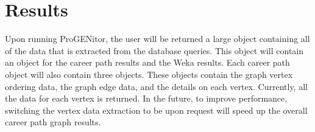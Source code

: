 \chapter{Results}
\label{chap:results}
Upon running ProGENitor, the user will be returned a large object
containing all of the data that is extracted from the database queries.  This
object will contain an object for the career path results and the Weka
results.  Each career path object will also contain three objects.  These
objects contain the graph vertex ordering data, the graph edge data, and the
details on each vertex.  Currently, all the data for each vertex is returned.  In
the future, to improve performance, switching the vertex data extraction to be
upon request will speed up the overall career path graph results.






